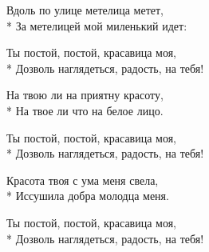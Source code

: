 \medskip

\begin{minipage}{\linewidth}
Вдоль по улице метелица метет,\\*
За метелицей мой миленький идет:\\
\end{minipage}\par\medskip\nobreak

\medskip

\begin{minipage}{\linewidth}
\hspace*{1.5em}Ты постой, постой, красавица моя,\\*
\hspace*{1.5em}Дозволь наглядеться, радость, на тебя!\\
\end{minipage}\par\medskip\nobreak

\medskip

\begin{minipage}{\linewidth}
На твою ли на приятну красоту,\\*
На твое ли что на белое лицо.\\
\end{minipage}\par\medskip\nobreak

\medskip

\begin{minipage}{\linewidth}
\hspace*{1.5em}Ты постой, постой, красавица моя,\\*
\hspace*{1.5em}Дозволь наглядеться, радость, на тебя!\\
\end{minipage}\par\medskip\nobreak

\medskip

\begin{minipage}{\linewidth}
Красота твоя с ума меня свела,\\*
Иссушила добра молодца меня.\\
\end{minipage}\par\medskip\nobreak

\medskip

\begin{minipage}{\linewidth}
\hspace*{1.5em}Ты постой, постой, красавица моя,\\*
\hspace*{1.5em}Дозволь наглядеться, радость, на тебя!\\
\end{minipage}\par\medskip\nobreak

